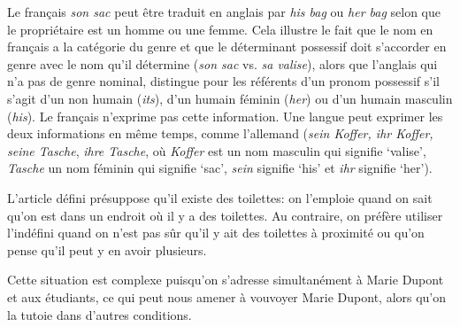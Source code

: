 {     Le français \textit{son sac} peut être traduit en anglais par \textit{his bag} ou \textit{her bag} selon que le propriétaire est un homme ou une femme. Cela illustre le fait que le nom en français a la catégorie du genre et que le déterminant possessif doit s’accorder en genre avec le nom qu’il détermine (\textit{son sac} vs. \textit{sa valise}), alors que l’anglais qui n’a pas de genre nominal, distingue pour les référents d’un pronom possessif s’il s’agit d’un non humain (\textit{its}), d’un humain féminin (\textit{her}) ou d’un humain masculin (\textit{his}). Le français n’exprime pas cette information. Une langue peut exprimer les deux informations en même temps, comme l’allemand (\textit{sein Koffer, ihr Koffer, seine Tasche}, \textit{ihre Tasche}, où \textit{Koffer} est un nom masculin qui signifie ‘valise’, \textit{Tasche} un nom féminin qui signifie ‘sac’, \textit{sein} signifie ‘his’ et \textit{ihr} signifie ‘her’).

     L’article défini présuppose qu’il existe des toilettes: on l’emploie quand on sait qu’on est dans un endroit où il y a des toilettes. Au contraire, on préfère utiliser l’indéfini quand on n’est pas sûr qu’il y ait des toilettes à proximité ou qu’on pense qu’il peut y en avoir plusieurs.

     Cette situation est complexe puisqu’on s’adresse simultanément à Marie Dupont et aux étudiants, ce qui peut nous amener à vouvoyer Marie Dupont, alors qu’on la tutoie dans d’autres conditions.
}
